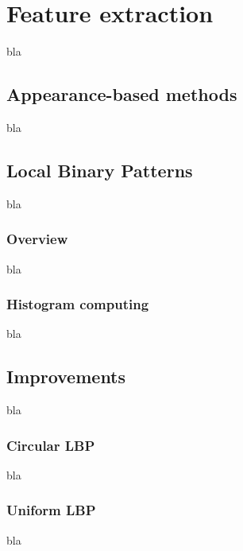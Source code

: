 \chapter{Feature extraction}

\noindent bla

\section{Appearance-based methods}

\noindent bla
\newline

\section{Local Binary Patterns}

\noindent bla
\newline

\subsection{Overview}

\vspace{\baselineskip}
\noindent bla
\newline

\subsection{Histogram computing}

\vspace{\baselineskip}
\noindent bla
\newline

\section{Improvements}

\noindent bla
\newline

\subsection{Circular LBP}

\vspace{\baselineskip}
\noindent bla
\newline

\subsection{Uniform LBP}

\vspace{\baselineskip}
\noindent bla
\newline

